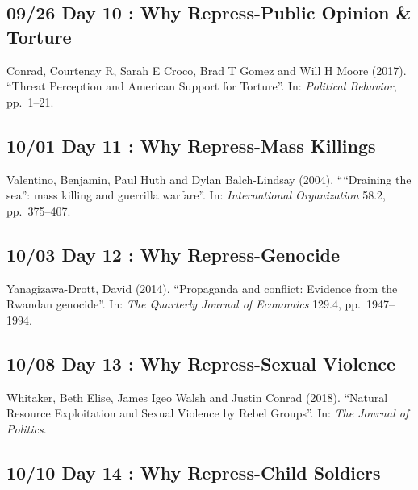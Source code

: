 \documentclass[11pt,]{article}
\begin{document}
\hypertarget{day-10-why-repress-public-opinion-torture}{%
\subsection{09/26 Day 10 : Why Repress-Public Opinion \&
Torture}\label{day-10-why-repress-public-opinion-torture}}

Conrad, Courtenay R, Sarah E Croco, Brad T Gomez and Will H Moore
(2017). ``Threat Perception and American Support for Torture''. In:
\emph{Political Behavior}, pp.~1--21.

\hypertarget{day-11-why-repress-mass-killings}{%
\subsection{10/01 Day 11 : Why Repress-Mass
Killings}\label{day-11-why-repress-mass-killings}}

Valentino, Benjamin, Paul Huth and Dylan Balch-Lindsay (2004).
````Draining the sea'': mass killing and guerrilla warfare''. In:
\emph{International Organization} 58.2, pp.~375--407.

\hypertarget{day-12-why-repress-genocide}{%
\subsection{10/03 Day 12 : Why
Repress-Genocide}\label{day-12-why-repress-genocide}}

Yanagizawa-Drott, David (2014). ``Propaganda and conflict: Evidence from
the Rwandan genocide''. In: \emph{The Quarterly Journal of Economics}
129.4, pp.~1947--1994.

\hypertarget{day-13-why-repress-sexual-violence}{%
\subsection{10/08 Day 13 : Why Repress-Sexual
Violence}\label{day-13-why-repress-sexual-violence}}

Whitaker, Beth Elise, James Igeo Walsh and Justin Conrad (2018).
``Natural Resource Exploitation and Sexual Violence by Rebel Groups''.
In: \emph{The Journal of Politics}.

\hypertarget{day-14-why-repress-child-soldiers}{%
\subsection{10/10 Day 14 : Why Repress-Child
Soldiers}\label{day-14-why-repress-child-soldiers}}
\end{document}
